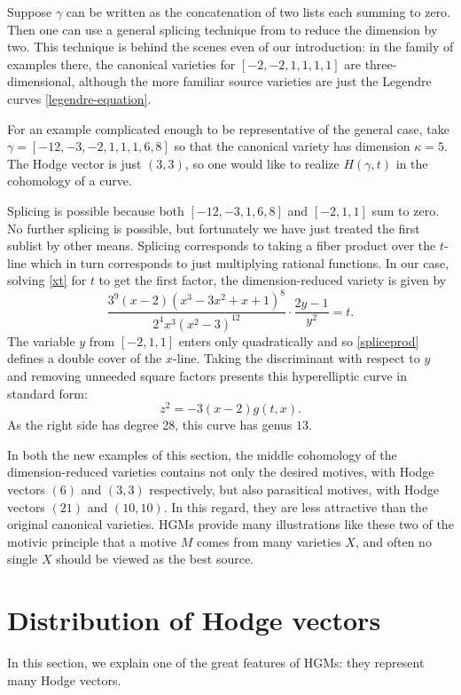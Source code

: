 \documentclass{notices}
\numberwithin{equation}{section}
\numberwithin{table}{section}
\numberwithin{figure}{section}
\begin{document}
{  Suppose $\gamma$ can be written as the concatenation
of two lists each summing to zero.  Then one can use a general splicing technique from \cite[\S6]{BCM} to
reduce the dimension by two.  This technique is behind the scenes even of our introduction: 
in the family of examples there, the canonical varieties for $[-2,-2,1,1,1,1]$ are three-dimensional, 
although the more familiar source varieties are just the Legendre curves \eqref{legendre-equation}.

For an example complicated enough to be representative of the general case,
take $\gamma = [-12,-3,-2,1,1,1,6,8]$ 
so that the canonical variety has dimension $\kappa = 5$.  
The Hodge vector is just $(3,3)$, so one would like to 
realize $H(\gamma,t)$ in the cohomology of a curve.  

Splicing is possible because both $[-12,-3,1,6,8]$ and  $[-2,1,1]$ sum to zero.  No further
splicing is possible, but fortunately we have just treated the first sublist
 by other means.  
Splicing corresponds to taking a fiber product over the $t$-line
which in turn corresponds to just multiplying rational functions. 
In our case, solving \eqref{xt} for $t$ to get the first factor,
the dimension-reduced variety is given by
 \begin{equation}
 \label{spliceprod}
 \frac{3^9(x-2) \left(x^3-3 x^2+x+1\right)^8}{2^4 x^3
    \left(x^2-3\right)^{12}} \cdot \frac{2y-1}{y^2} = t.
 \end{equation}
 The variable $y$ from $[-2,1,1]$ enters only quadratically and so \eqref{spliceprod} defines
 a double cover of the $x$-line.   Taking the discriminant with respect 
 to $y$ and removing unneeded square factors presents this hyperelliptic
 curve in standard form:
\[
z^2 = -3 (x-2) g(t,x).
\]
As the right side has degree 28, this curve has 
genus $13$.   
  
    In both the new examples of this section, the middle cohomology
of the dimension-reduced varieties contains not only the
desired motives, with Hodge vectors $(6)$ and $(3,3)$ respectively,
but also parasitical motives, with Hodge vectors $(21)$ 
and $(10,10)$.    In this regard, they are less attractive
than the original canonical varieties.  HGMs
provide many illustrations like these two of the motivic principle that
a motive $M$ comes from many varieties $X$, 
and often no single $X$ should be viewed as the best
source.  

\section{Distribution of Hodge vectors}
\label{distribution}
In this section, we explain one of the great features of HGMs: they
represent many Hodge vectors.  

}
\end{document}

